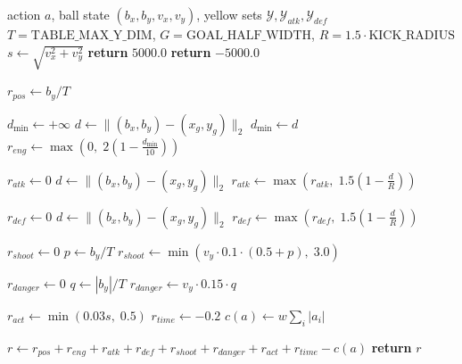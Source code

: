 
\begin{algorithm}[ht]
\begin{algorithmic}
	 action $a$, ball state $(b_x,b_y,v_x,v_y)$, yellow sets $\mathcal{Y},\mathcal{Y}_{atk},\mathcal{Y}_{def}$
	 $T=\mathrm{TABLE\_MAX\_Y\_DIM}$, $G=\mathrm{GOAL\_HALF\_WIDTH}$, $R=1.5\cdot\mathrm{KICK\_RADIUS}$
	\STATE $s \leftarrow \sqrt{v_x^2+v_y^2}$
		\STATE \textbf{return} $5000.0$ 
	\ENDIF
		\STATE \textbf{return} $-5000.0$ 
	\ENDIF

	\STATE $r_{pos} \leftarrow b_y/T$

	\STATE $d_{\min} \leftarrow +\infty$
		\STATE $d \leftarrow \lVert (b_x,b_y) - (x_g,y_g) \rVert_2$
			\STATE $d_{\min} \leftarrow d$
		\ENDIF
	\ENDFOR
	\STATE $r_{eng} \leftarrow \max\left(0,\;2\left(1-\frac{d_{\min}}{10}\right)\right)$

	\STATE $r_{atk} \leftarrow 0$
			\STATE $d \leftarrow \lVert (b_x,b_y) - (x_g,y_g) \rVert_2$
				\STATE $r_{atk} \leftarrow \max\left(r_{atk},\;1.5\left(1-\frac{d}{R}\right)\right)$
			\ENDIF
		\ENDFOR
	\ENDIF

	\STATE $r_{def} \leftarrow 0$
			\STATE $d \leftarrow \lVert (b_x,b_y) - (x_g,y_g) \rVert_2$
				\STATE $r_{def} \leftarrow \max\left(r_{def},\;1.5\left(1-\frac{d}{R}\right)\right)$
			\ENDIF
		\ENDFOR
	\ENDIF

	\STATE $r_{shoot} \leftarrow 0$
		\STATE $p \leftarrow b_y/T$
		\STATE $r_{shoot} \leftarrow \min\left(v_y\cdot0.1\cdot(0.5+p),\;3.0\right)$
	\ENDIF

	\STATE $r_{danger} \leftarrow 0$
		\STATE $q \leftarrow |b_y|/T$
		\STATE $r_{danger} \leftarrow v_y\cdot0.15\cdot q$
	\ENDIF

	\STATE $r_{act} \leftarrow \min(0.03s,\;0.5)$
	\STATE $r_{time} \leftarrow -0.2$
	\STATE $c(a) \leftarrow w\sum_i |a_i|$ 

	\STATE $r \leftarrow r_{pos}+r_{eng}+r_{atk}+r_{def}+r_{shoot}+r_{danger}+r_{act}+r_{time}-c(a)$
	\STATE \textbf{return} $r$
\end{algorithmic}
\caption{Foosball v2 Reward Function ($\texttt{compute\_reward}$)}
\label{alg:foosball_v2_reward}
\end{algorithm}
